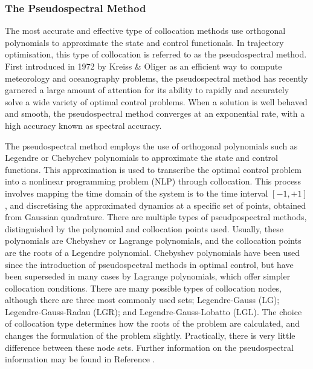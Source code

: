 \subsubsection{The Pseudospectral Method}\label{sec:PS}


The most accurate and effective type of collocation methods use orthogonal polynomials to approximate the state and control functionals\cite{Fahroo2000}. In trajectory optimisation, this type of collocation is referred to as the pseudospectral method\cite{Kelly2015}. 
First introduced in 1972 by Kreiss \& Oliger\cite{Kreiss1972} as an efficient way to compute meteorology and oceanography problems, the pseudospectral method has recently garnered a large amount of attention for its ability to rapidly and accurately solve a wide variety of optimal control problems.  When a solution is well behaved and smooth, the pseudospectral method converges at an exponential rate, with a high accuracy known as spectral accuracy\cite{Ross2004,Darby2011a}. 

The pseudospectral method employs the use of orthogonal polynomials such as Legendre or Chebychev polynomials to approximate the state and control functions.
This approximation is used to transcribe the optimal control problem into a nonlinear programming problem (NLP) through collocation. This process involves mapping the time domain of the system is to the time interval $[-1,+1]$, and discretising the approximated dynamics at a specific set of points, obtained from Gaussian quadrature\cite{Fahroo2000,Huntington2007,Kelly2015,Rao2009,Garg2011}. 
There are multiple types of pseudpospectral methods, distinguished by the polynomial and collocation points used. Usually, these polynomials are Chebyshev or Lagrange polynomials\cite{Fahroo2000,Rao2009}, and the collocation points are the roots of a Legendre polynomial\cite{Garg2009}. Chebyshev polynomials have been used since the introduction of pseudospectral methods in optimal control, but have been superseded in many cases by Lagrange polynomials, which offer simpler collocation conditions\cite{Rao2009}. 
There are many possible types of collocation nodes, although there are three most commonly used sets; Legendre-Gauss (LG); Legendre-Gauss-Radau (LGR); and Legendre-Gauss-Lobatto (LGL)\cite{Garg2009,Rao2009}. The choice of collocation type determines how the roots of the problem are calculated, and changes the formulation of the problem slightly\cite{Garg2009}. Practically, there is very little difference between these node sets\cite{Garg2009}.
Further information on the pseudospectral information may be found in Reference \cite{Huntington2007}.


